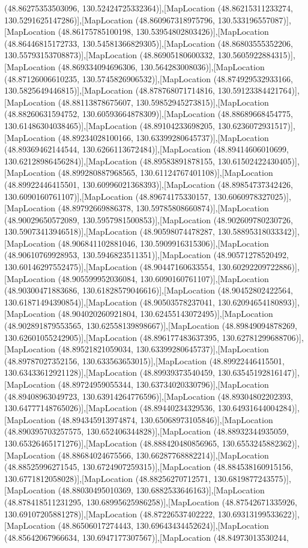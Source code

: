 (48.86275353503096, 130.52424725332364)],[MapLocation (48.86215311233274, 130.5291625147286)],[MapLocation (48.860967318975796, 130.533196557087)],[MapLocation (48.86175785100198, 130.53954802803426)],[MapLocation (48.86446815172733, 130.54581366829305)],[MapLocation (48.86803555352206, 130.55793153708873)],[MapLocation (48.86905180600332, 130.5605922884315)],[MapLocation (48.869334094696306, 130.564283008036)],[MapLocation (48.87126006610235, 130.5745826906532)],[MapLocation (48.874929532933166, 130.5825649446815)],[MapLocation (48.878768071714816, 130.59123384421764)],[MapLocation (48.88113878675607, 130.59852945273815)],[MapLocation (48.88260631594752, 130.60593664878309)],[MapLocation (48.88689668454775, 130.61486304038465)],[MapLocation (48.89104233698205, 130.6236072931517)],[MapLocation (48.89234028100166, 130.63399280645737)],[MapLocation (48.89369462144544, 130.6266113672484)],[MapLocation (48.89414606010699, 130.62128986456284)],[MapLocation (48.89583891878155, 130.61502422430405)],[MapLocation (48.899280887968565, 130.61124767401108)],[MapLocation (48.89922446415501, 130.60996021368393)],[MapLocation (48.89854737342426, 130.6090160761107)],[MapLocation (48.89674175330157, 130.6060978327025)],[MapLocation (48.89792669886378, 130.59785808660874)],[MapLocation (48.90029650572089, 130.5957981500853)],[MapLocation (48.902609780230726, 130.59073413946518)],[MapLocation (48.90598074478287, 130.58895318033342)],[MapLocation (48.906841102881046, 130.5909916315306)],[MapLocation (48.90610769928953, 130.5946823511351)],[MapLocation (48.90571278520492, 130.60146297552475)],[MapLocation (48.90447160633554, 130.60292209722886)],[MapLocation (48.905599952036084, 130.6090160761107)],[MapLocation (48.90300471883686, 130.61828579046616)],[MapLocation (48.90452802422564, 130.61871494390854)],[MapLocation (48.90503578237041, 130.62094654180893)],[MapLocation (48.904020260921804, 130.62455143072495)],[MapLocation (48.902891879553565, 130.62558139898667)],[MapLocation (48.89849094878269, 130.62601055242905)],[MapLocation (48.896177483637395, 130.62781299688706)],[MapLocation (48.89521821059034, 130.63399280645737)],[MapLocation (48.89787027352156, 130.633563653015)],[MapLocation (48.89922446415501, 130.63433612921128)],[MapLocation (48.89939373540459, 130.63545192816147)],[MapLocation (48.89724959055344, 130.63734020330796)],[MapLocation (48.89408963049723, 130.63914264776596)],[MapLocation (48.89304802202393, 130.64777148765026)],[MapLocation (48.89440234329536, 130.64931644004284)],[MapLocation (48.894345913974874, 130.65068973105846)],[MapLocation (48.890395703257575, 130.652406344828)],[MapLocation (48.88932344935059, 130.65326465171276)],[MapLocation (48.888420480856965, 130.6553245882362)],[MapLocation (48.88684024675566, 130.66287768882214)],[MapLocation (48.88525996271545, 130.6724907259315)],[MapLocation (48.884538160915156, 130.6771812058028)],[MapLocation (48.88256270712571, 130.6819877243575)],[MapLocation (48.88030495010369, 130.6882533646163)],[MapLocation (48.878418511231295, 130.68995625986258)],[MapLocation (48.87542671335926, 130.69107205881278)],[MapLocation (48.87226537402222, 130.69313199533622)],[MapLocation (48.86506017274443, 130.69643434452624)],[MapLocation (48.85642067966634, 130.6947177307567)],[MapLocation (48.84973013530244, 